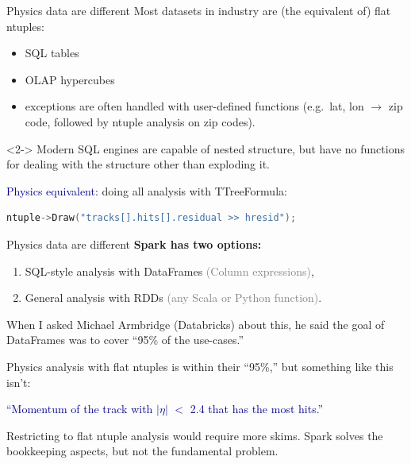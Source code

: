 \documentclass{beamer}
\begin{document}
\begin{frame}[fragile]{Physics data are different}
\vspace{0.5 cm}
Most datasets in industry are (the equivalent of) flat ntuples:
\begin{itemize}
\item SQL tables
\item OLAP hypercubes
\item exceptions are often handled with user-defined functions
(e.g.\ lat, lon $\to$ zip code, followed by ntuple analysis on zip codes).
\end{itemize}

\vfill
\begin{uncoverenv}<2->
Modern SQL engines are capable of nested structure, but have no functions for dealing with the structure other than exploding it.

\vspace{0.25 cm}
\textcolor{darkblue}{Physics equivalent:} doing all analysis with TTreeFormula:

\begin{lstlisting}[language=c]
ntuple->Draw("tracks[].hits[].residual >> hresid");
\end{lstlisting}
\end{uncoverenv}
\end{frame}

\begin{frame}{Physics data are different}
\vspace{0.25 cm}
{\bf Spark has two options:}
\begin{enumerate}
\item SQL-style analysis with DataFrames \textcolor{gray}{(Column expressions)},
\item General analysis with RDDs \textcolor{gray}{(any Scala or Python function)}.
\end{enumerate}
When I asked Michael Armbridge (Databricks) about this, he said the goal of DataFrames was to cover ``95\% of the use-cases.''

\vfill
Physics analysis with flat ntuples is within their ``95\%,'' but something like this isn't:
\begin{center}
\begin{minipage}{0.95\linewidth}
\textcolor{darkblue}{``Momentum of the track with $|\eta|$ $<$ 2.4 that has the most hits.''}
\end{minipage}
\end{center}

\vfill
Restricting to flat ntuple analysis would require more skims. Spark solves the bookkeeping aspects, but not the fundamental problem.
\end{frame}
\end{document}

